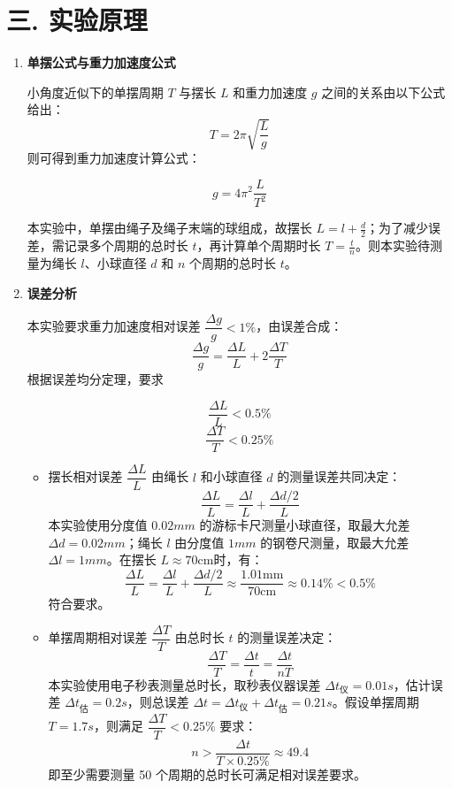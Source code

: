 \documentclass[12pt,a4paper]{article}
\begin{document}
	\section*{\textbf{{三. 实验原理}}}
	\begin{enumerate}
		\item \textbf{单摆公式与重力加速度公式}
		
		小角度近似下的单摆周期 $T$ 与摆长 $L$ 和重力加速度 $g$ 之间的关系由以下公式给出：
		$$T=2\pi\sqrt{\dfrac{L}{g}}$$
		则可得到重力加速度计算公式：

		$$g=4\pi^2\dfrac{L}{T^2}$$

		本实验中，单摆由绳子及绳子末端的球组成，故摆长 $L = l + \frac{d}2$；为了减少误差，需记录多个周期的总时长 $t$，再计算单个周期时长 $T = \frac{t}n$。则本实验待测量为绳长 $l$、小球直径 $d$ 和 $n$ 个周期的总时长 $t$。

		\item \textbf{误差分析}
		
		本实验要求重力加速度相对误差 $\dfrac{\Delta g}{g} < 1 \% $，由误差合成：$$\dfrac{\Delta g}{g} = \dfrac{\Delta L}{L} + 2\dfrac{\Delta T}{T}$$
		根据误差均分定理，要求 
		
		$$\dfrac{\Delta L}{L} < 0.5 \% $$
		$$\dfrac{\Delta T}{T} < 0.25 \% $$

		\begin{itemize}
			\item 摆长相对误差 $\dfrac{\Delta L}{L}$ 由绳长 $l$ 和小球直径 $d$ 的测量误差共同决定：
			$$\dfrac{\Delta L}{L} = \dfrac{\Delta l}{L} + \dfrac{\Delta d / 2}{L}$$
			本实验使用分度值 $0.02mm$ 的游标卡尺测量小球直径，取最大允差 $\Delta d = 0.02mm$；绳长 $l$ 由分度值 $1mm$ 的钢卷尺测量，取最大允差 $\Delta l = 1mm$。在摆长 $L \approx 70 \mathrm{cm}$时，有：
			$$\dfrac{\Delta L}{L} = \dfrac{\Delta l}{L} + \dfrac{\Delta d / 2}{L} \approx \dfrac{1.01\mathrm{mm}}{70\mathrm{cm}} \approx 0.14\% < 0.5\% $$
			符合要求。

			\item 单摆周期相对误差 $\dfrac{\Delta T}{T}$ 由总时长 $t$ 的测量误差决定：
			$$\dfrac{\Delta T}{T} = \dfrac{\Delta t}{t} = \dfrac{\Delta t}{nT}$$
			本实验使用电子秒表测量总时长，取秒表仪器误差 $\Delta t_{\text{仪}} = 0.01s$，估计误差 $\Delta t_{\text{估}} = 0.2s$，则总误差 $\Delta t = \Delta t_{\text{仪}} + \Delta t_{\text{估}} = 0.21s$。假设单摆周期 $T = 1.7s$，则满足 $\dfrac{\Delta T}{T} < 0.25\%$ 要求：
			$$n > \dfrac{\Delta t}{T\times 0.25\%} \approx 49.4$$
			即至少需要测量 50 个周期的总时长可满足相对误差要求。

		\end{itemize}
		
	\end{enumerate}
	
\end{document}
